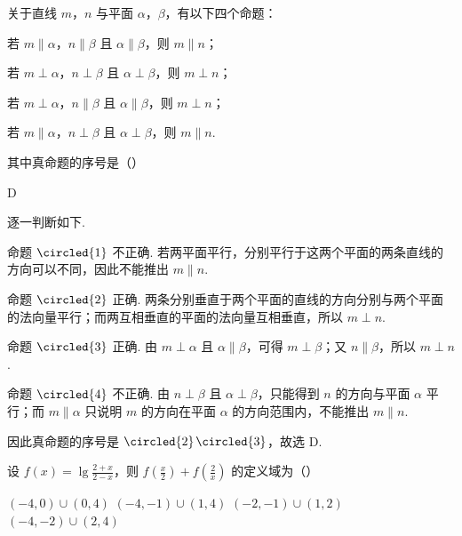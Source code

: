 \begin{problem}
关于直线 \(m\)，\(n\) 与平面 \(\alpha\)，\(\beta\)，有以下四个命题：

\begin{circlelist}
\item 若 \(m \parallel \alpha\)，\(n \parallel \beta\) 且 \(\alpha \parallel \beta\)，则 \(m \parallel n\)；
\item 若 \(m \perp \alpha\)，\(n \perp \beta\) 且 \(\alpha \perp \beta\)，则 \(m \perp n\)；
\item 若 \(m \perp \alpha\)，\(n \parallel \beta\) 且 \(\alpha \parallel \beta\)，则 \(m \perp n\)；
\item 若 \(m \parallel \alpha\)，\(n \perp \beta\) 且 \(\alpha \perp \beta\)，则 \(m \parallel n\).
\end{circlelist}

其中真命题的序号是（\quad）

\choices
    {}
    {}
    {}
    {}
\end{problem}

\begin{answer}
D
\end{answer}

\begin{solution}
逐一判断如下.

命题 \(\circled{1}\) 不正确. 若两平面平行，分别平行于这两个平面的两条直线的方向可以不同，因此不能推出 \(m\parallel n\).

命题 \(\circled{2}\) 正确. 两条分别垂直于两个平面的直线的方向分别与两个平面的法向量平行；而两互相垂直的平面的法向量互相垂直，所以 \(m\perp n\).

命题 \(\circled{3}\) 正确. 由 \(m\perp\alpha\) 且 \(\alpha\parallel\beta\)，可得 \(m\perp\beta\)；又 \(n\parallel\beta\)，所以 \(m\perp n\).

命题 \(\circled{4}\) 不正确. 由 \(n\perp\beta\) 且 \(\alpha\perp\beta\)，只能得到 \(n\) 的方向与平面 \(\alpha\) 平行；而 \(m\parallel\alpha\) 只说明 \(m\) 的方向在平面 \(\alpha\) 的方向范围内，不能推出 \(m\parallel n\).

因此真命题的序号是 \(\circled{2}\)\(\circled{3}\)，故选 D.
\end{solution}

\begin{problem}
设 \( f(x) = \lg \frac{2 + x}{2 - x} \)，则 \( f\left(\frac{x}{2}\right) + f\left(\frac{2}{x}\right) \) 的定义域为（\quad）

\choices
    {\((-4,0)\cup (0,4)\)}
    {\((-4, - 1)\cup (1,4)\)}
    {\((-2, - 1)\cup (1,2)\)}
    {\((-4, - 2)\cup (2,4)\)}
\end{problem}

